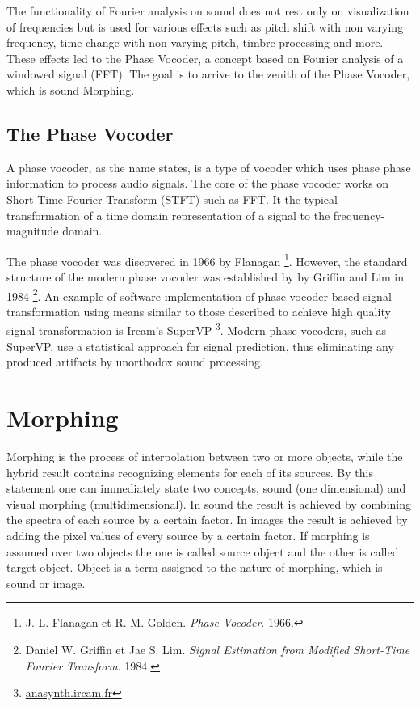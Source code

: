 	The functionality of Fourier analysis on sound does not rest only on visualization of frequencies but is used for various effects such as pitch shift with non varying frequency, time change with non varying pitch, timbre processing and more. These effects led to the Phase Vocoder, a concept based on Fourier analysis of a windowed signal (FFT). The goal is to arrive to the zenith of the Phase Vocoder, which is sound Morphing. 

	\subsection{The Phase Vocoder}	

		A phase vocoder, as the name states, is a type of vocoder which uses phase phase information to process audio signals. The core of the phase vocoder works on Short-Time Fourier Transform (STFT) such as FFT. It the typical transformation of a time domain representation of a signal to  the frequency-magnitude domain.

		The phase vocoder was discovered in 1966 by Flanagan \footnote{J. L. Flanagan et R. M. Golden. \textit{Phase Vocoder}. 1966. \nocite{flanagan}}. However, the standard structure of the modern phase vocoder was established by by Griffin and Lim in 1984 \footnote{Daniel W. Griffin et Jae S. Lim. \textit{Signal Estimation from Modified Short-Time Fourier Transform}. 1984. \nocite{GrL84}}. An example of software implementation of phase vocoder based signal transformation using means similar to those described to achieve high quality signal transformation is Ircam's SuperVP \footnote{\href{http://anasynth.ircam.fr/home/english/software/supervp}{anasynth.ircam.fr}}. Modern phase vocoders, such as SuperVP, use a statistical approach for signal prediction, thus eliminating any produced artifacts by unorthodox sound processing. 

\section{Morphing}

Morphing is the process of interpolation between two or more objects, while the hybrid result contains recognizing elements for each of its sources. By this statement one can immediately state two concepts, sound (one dimensional) and visual morphing (multidimensional). In sound the result is achieved by combining the spectra of each source by a certain factor. In images the result is achieved by adding the pixel values of every source by a certain factor. If morphing is assumed over two objects the one is called source object and the other is called target object. Object is a term assigned to the nature of morphing, which is sound or image.


